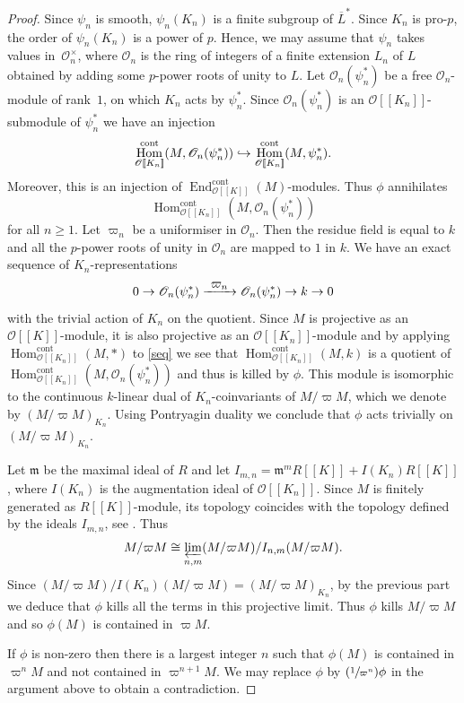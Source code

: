 \documentclass[11pt]{article}
\let\mathcal\mathscr
\newcommand{\To}[1]{\mathchoice{\xrightarrow{\textstyle\kern4pt#1\kern3pt}}{\stackrel{#1}{\longrightarrow}}{}{}}
\newcommand\hto{\mathrel{\lhook\joinrel\to}}
\newcommand{\Psfrac}[2]{(\sfrac{#1}{#2})}
\theoremstyle{definition}
\DeclareMathOperator{\End}{End}
\DeclareMathOperator{\Hom}{Hom}
\newcommand{\br}[1]{[\![#1]\!]}
\newcommand{\mm}{\mathfrak m}
\newcommand{\cO}{\mathcal{O}}
\newcommand{\cont}{\mathrm{cont}}
\begin{document}
\begin{proof} Since $\psi_n$ is smooth, $\psi_n(K_n)$ is a finite subgroup of $\overline{L}^*$. Since $K_n$ is pro-$p$, the order of $\psi_n(K_n)$ is a power of $p$. Hence, we may assume that $\psi_n$ takes values in~$\cO_n^{\times}$, where $\cO_n$ is
the ring of integers of a finite extension $L_n$ of $L$ obtained by adding some $p$-power roots of unity to $L$. Let $\cO_n(\psi_n^*)$ be a free $\cO_n$-module of rank~$1$, on which $K_n$ acts by $\psi_n^*$. Since $\cO_n(\psi_n^*)$ is an $\cO\br{K_n}$-submodule of $\psi_n^*$ we have an injection
\[
\Hom_{\cO\br{K_n}}^{\cont}(M, \cO_n(\psi_n^*))\hto
\Hom_{\cO\br{K_n}}^{\cont}(M, \psi_n^*).
\]
Moreover, this is an injection of $\End_{\cO\br{K}}^{\cont}(M)$-modules. Thus $\phi$ annihilates
\[
\Hom_{\cO\br{K_n}}^{\cont}(M, \cO_n(\psi_n^*))
\]
for all $n\ge 1$. Let $\varpi_n$ be a uniformiser in $\cO_n$. Then the residue field is equal to $k$ and all the $p$-power roots of unity in $\cO_n$ are mapped to $1$ in $k$. We have an exact sequence of $K_n$-representations
\begin{equation}\label{seq}
0\to \cO_n(\psi_n^*)\To{\varpi_n}\cO_n(\psi_n^*)\to k\to 0
\end{equation}
with the trivial action of $K_n$ on the quotient. Since $M$ is projective as an $\cO\br{K}$-module,
it is also projective as an $\cO\br{K_n}$-module and
by applying $\Hom^{\cont}_{\cO\br{K_n}}(M, \ast)$ to \eqref{seq} we see that
$\Hom^{\cont}_{\cO\br{K_n}}(M, k)$ is a quotient of $\Hom_{\cO\br{K_n}}^{\cont}(M, \cO_n(\psi_n^*))$ and thus is killed by $\phi$. This module is isomorphic to the continuous $k$-linear dual of $K_n$-coinvariants
of $M/\varpi M$, which we denote by $(M/\varpi M)_{K_n}$. Using Pontryagin duality we conclude that $\phi$ acts trivially on $(M/\varpi M)_{K_n}$.

Let $\mm$ be the maximal ideal of $R$ and let $I_{m,n}= \mm^m R\br{K} + I(K_n)R\br{K}$, where $I(K_n)$ is
the augmentation ideal of $\cO\br{K_n}$. Since $M$ is finitely generated as $R\br{K}$\nobreakdash-mod\-ule, its topology coincides with the topology defined by the ideals $I_{m,n}$, see \cite[(5.2.17)]{nsw2}. Thus
\[
M/\varpi M \cong \varprojlim_{n, m} (M/\varpi M)/ I_{n,m} (M/\varpi M). 
\]
Since $(M/\varpi M)/ I(K_n) ( M/\varpi M)= (M/\varpi M)_{K_n}$, by the previous part we deduce that $\phi$ kills all the terms in this projective limit. Thus $\phi$ kills $M/\varpi M$ and so $\phi(M)$ is contained in $\varpi M$.

If $\phi$ is non-zero then there is a largest integer $n$ such that $\phi(M)$ is contained in $\varpi^n M$ and
not contained in
$\varpi^{n+1} M$. We may replace $\phi$ by $\Psfrac{1}{\varpi^n}\phi $ in the argument above to obtain a contradiction.
\end{proof}
\end{document}
